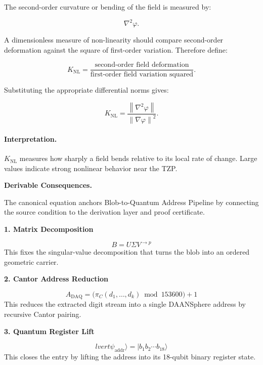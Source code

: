 The second-order curvature or bending of the field is measured by:

\begin{equation}
\nabla^2\varphi .
\end{equation}

A dimensionless measure of non-linearity should compare second-order deformation against the square of first-order variation. Therefore define:

\begin{equation}
K_{\mathrm{NL}}
=
\frac{\text{second-order field deformation}}
{\text{first-order field variation squared}} .
\end{equation}

Substituting the appropriate differential norms gives:

\begin{equation}
\boxed{
K_{\mathrm{NL}}
=
\frac{\left\lVert \nabla^{2}\varphi\right\rVert}
{\left\lVert \nabla\varphi\right\rVert^{2}} .
}
\end{equation}

\paragraph{Interpretation.}
$K_{\mathrm{NL}}$ measures how sharply a field bends relative to its local rate of change. Large values indicate strong nonlinear behavior near the TZP.

\par\vspace{0.35em}
\noindent\textbf{Derivable Consequences.}\quad
\begingroup
\footnotesize
\raggedright
The canonical equation anchors Blob-to-Quantum Address Pipeline by connecting the source condition to the derivation layer and proof certificate.
\par\endgroup

\noindent\textbf{1. Matrix Decomposition}\par
\[
B=U\Sigma V^{\to p}
\]
\noindent This fixes the singular-value decomposition that turns the blob into an ordered geometric carrier.\par
\noindent\textbf{2. Cantor Address Reduction}\par
\[
A_{\mathrm{DAQ}}=\bigl(\pi_C(d_1,\ldots,d_k)\bmod 153600\bigr)+1
\]
\noindent This reduces the extracted digit stream into a single DAANSphere address by recursive Cantor pairing.\par
\noindent\textbf{3. Quantum Register Lift}\par
\[
lvert \psi_{\mathrm{addr}}\rangle=\lvert b_1b_2\cdots b_{18}\rangle
\]
\noindent This closes the entry by lifting the address into its 18-qubit binary register state.\par


